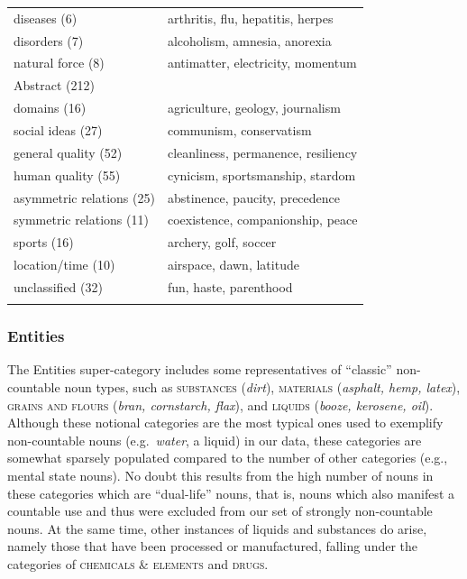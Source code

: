 \documentclass[output=paper]{langscibook}
\begin{document}
\begin{table}
\begin{tabular}{ll}
   diseases (6) &   arthritis, flu, hepatitis, herpes \\	
  disorders (7)  &  alcoholism, amnesia, anorexia \\
  natural force (8)&   antimatter, electricity,  momentum \\
\midrule  
 \multicolumn{2}{l}{{Abstract (212)}}\\
  \midrule
    domains  (16) &  agriculture, geology, journalism \\
  social ideas (27)  &   communism,  conservatism \\
   general quality (52) & cleanliness, permanence, resiliency \\
  human quality (55) & cynicism, sportsmanship, stardom   \\
  asymmetric relations (25) &  abstinence,  paucity, precedence \\
  symmetric relations (11) &  coexistence, companionship, peace\\
  sports (16)&  archery, golf, soccer \\
  location/time (10) & airspace, dawn, latitude  \\\midrule
  unclassified (32)  & fun, haste,  parenthood \\
  \lspbottomrule
 \end{tabular}
\end{table}





\subsubsection{Entities} The Entities super-category includes some representatives of ``classic'' non-count\-able noun types, such as \textsc{substances} (\textit{dirt}), \textsc{materials} (\textit{asphalt, hemp, latex}), \textsc{grains and flours} (\textit{bran,
cornstarch, flax}), and  \textsc{liquids} (\textit{booze, kerosene, oil}).  Although these notional categories are the most typical ones used to exemplify non-countable nouns (e.g.\ \textit{water}, a liquid) in our data, these categories are somewhat sparsely populated compared to the number of other categories (e.g., mental state nouns).  No doubt this results from the high number of nouns in these categories which are ``dual-life'' nouns, that is, nouns which also manifest a countable use and thus were excluded from our set of strongly non-countable nouns. At the same time, other instances of liquids and substances do arise, namely those that have been processed or manufactured, falling under the  categories of \textsc{chemicals \& elements} and \textsc{drugs}.   
\end{document}
